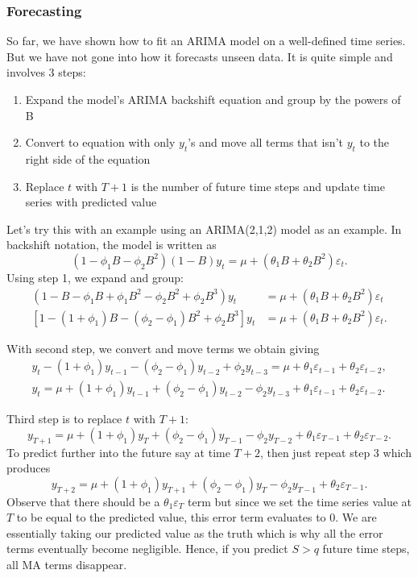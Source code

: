 \documentclass{article}
\begin{document}
  \subsubsection{Forecasting}
  So far, we have shown how to fit an ARIMA model on a well-defined time series. But we have not gone into how it forecasts unseen data. It is quite simple and involves 3 steps:
  \begin{enumerate}
    \item Expand the model's ARIMA backshift equation and group by the powers of B
    \item Convert to equation with only $y_t$'s and move all terms that isn't $y_t$ to the right side of the equation
    \item Replace $t$ with $T+1$ is the number of future time steps and update time series with predicted value
  \end{enumerate}
  Let's try this with an example using an ARIMA(2,1,2) model as an example. In backshift notation, the model is written as
  \begin{equation*}
    (1 - \phi_1B - \phi_2B^2)(1-B)y_t = \mu + (\theta_1B + \theta_2B^2)\varepsilon_t.
  \end{equation*}
  Using step 1, we expand and group:
  \begin{align*}
    (1 - B - \phi_1B + \phi_1B^2 - \phi_2B^2 + \phi_2B^3)y_t &= \mu + (\theta_1B + \theta_2B^2)\varepsilon_t\\
    [1 - (1 + \phi_1)B - (\phi_2 - \phi_1)B^2 + \phi_2B^3]y_t &= \mu + (\theta_1B + \theta_2B^2)\varepsilon_t.
  \end{align*}

  With second step, we convert and move terms we obtain giving
  \begin{gather*}
    y_t - (1 + \phi_1)y_{t-1} - (\phi_2 - \phi_1)y_{t-2} + \phi_2y_{t-3} = \mu + \theta_1\varepsilon_{t-1} + \theta_2\varepsilon_{t-2},\\
    y_t = \mu + (1 + \phi_1)y_{t-1} + (\phi_2 - \phi_1)y_{t-2} - \phi_2y_{t-3} + \theta_1\varepsilon_{t-1} + \theta_2\varepsilon_{t-2}.
  \end{gather*}

  Third step is to replace $t$ with $T+1$:
  \begin{equation*}
    y_{T+1} = \mu + (1 + \phi_1)y_{T} + (\phi_2 - \phi_1)y_{T-1} - \phi_2y_{T-2} + \theta_1\varepsilon_{T-1} + \theta_2\varepsilon_{T-2}.
  \end{equation*}
  To predict further into the future say at time $T+2$, then just repeat step 3 which produces
  \begin{equation*}
    y_{T+2} = \mu + (1 + \phi_1)y_{T+1} + (\phi_2 - \phi_1)y_{T} - \phi_2y_{T-1} + \theta_2\varepsilon_{T-1}.
  \end{equation*}
  Observe that there should be a $\theta_1\varepsilon_{T}$ term but since we set the time series value at $T$ to be equal to the predicted value, this error term evaluates to 0. We are essentially taking our predicted value as the truth which is why all the error terms eventually become negligible. Hence, if you predict $S > q$ future time steps, all MA terms disappear. 
\end{document}

